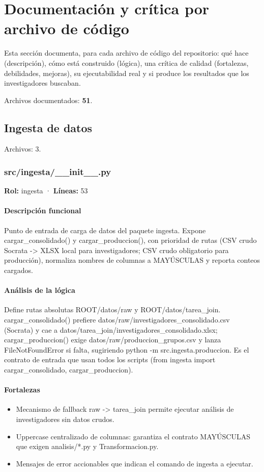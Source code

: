 
\section{Documentación y crítica por archivo de código}

Esta sección documenta, para cada archivo de código del repositorio:
qué hace (descripción), cómo está construido (lógica), una crítica de
calidad (fortalezas, debilidades, mejoras), su ejecutabilidad real y
si produce los resultados que los investigadores buscaban.

\noindent Archivos documentados: \textbf{51}.

\subsection{Ingesta de datos}
\noindent Archivos: 3.

\subsubsection{src/ingesta/\_\_init\_\_.py}
\textbf{Rol:} ingesta · \textbf{Líneas:} 53

\paragraph{Descripción funcional}
Punto de entrada de carga de datos del paquete ingesta. Expone cargar\_consolidado() y cargar\_produccion(), con prioridad de rutas (CSV crudo Socrata -> XLSX local para investigadores; CSV crudo obligatorio para producción), normaliza nombres de columnas a MAYÚSCULAS y reporta conteos cargados.

\paragraph{Análisis de la lógica}
Define rutas absolutas ROOT/datos/raw y ROOT/datos/tarea\_join. cargar\_consolidado() prefiere datos/raw/investigadores\_consolidado.csv (Socrata) y cae a datos/tarea\_join/investigadores\_consolidado.xlsx; cargar\_produccion() exige datos/raw/produccion\_grupos.csv y lanza FileNotFoundError si falta, sugiriendo python -m src.ingesta.produccion. Es el contrato de entrada que usan todos los scripts (from ingesta import cargar\_consolidado, cargar\_produccion).

\paragraph{Fortalezas}
\begin{itemize}
  \item Mecanismo de fallback raw -> tarea\_join permite ejecutar análisis de investigadores sin datos crudos.
  \item Uppercase centralizado de columnas: garantiza el contrato MAYÚSCULAS que exigen analisis/*.py y Transformacion.py.
  \item Mensajes de error accionables que indican el comando de ingesta a ejecutar.
\end{itemize}

